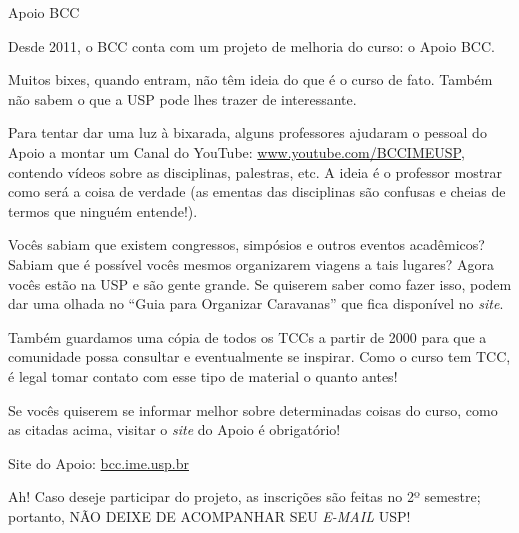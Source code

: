 \begin{subsubsecao}{Apoio BCC}

Desde 2011, o BCC conta com um projeto de melhoria do curso: o Apoio BCC.

Muitos bixes, quando entram, não têm ideia do que é o curso de fato. Também não 
sabem o que a USP pode lhes trazer de interessante.

Para tentar dar uma luz à bixarada, alguns professores ajudaram o pessoal do
Apoio a montar um Canal do YouTube: \url{www.youtube.com/BCCIMEUSP}, contendo
vídeos sobre as disciplinas, palestras, etc. A ideia é o professor mostrar como
será a coisa de verdade (as ementas das disciplinas são confusas e cheias de
termos que ninguém entende!).

Vocês sabiam que existem congressos, simpósios e outros eventos acadêmicos?
Sabiam que é possível vocês mesmos organizarem viagens a tais lugares? Agora
vocês estão na USP e são gente grande. Se quiserem saber como fazer isso, podem 
dar uma olhada no ``Guia para Organizar Caravanas'' que fica disponível 
no \textit{site}.

Também guardamos uma cópia de todos os TCCs a partir de 2000 para que a 
comunidade possa consultar e eventualmente se inspirar. Como o curso tem TCC, é 
legal tomar contato com esse tipo de material o quanto antes!

Se vocês quiserem se informar melhor sobre determinadas coisas do curso, como as
citadas acima, visitar o \textit{site} do Apoio é obrigatório!

Site do Apoio: \url{bcc.ime.usp.br}

Ah! Caso deseje participar do projeto, as inscrições são feitas no 2º 
semestre; portanto, NÃO DEIXE DE ACOMPANHAR SEU \textit{E-MAIL} USP!

\end{subsubsecao}
